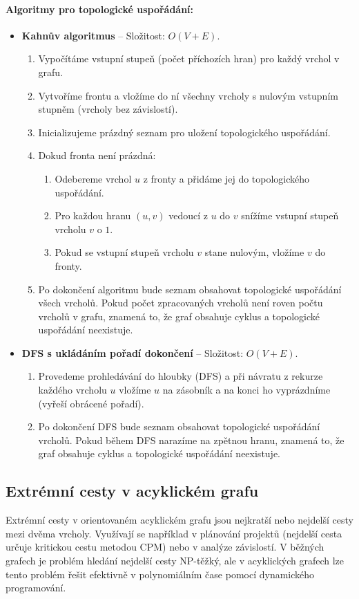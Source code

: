 \paragraph*{Algoritmy pro topologické uspořádání:}
\begin{itemize}
\item \textbf{Kahnův algoritmus} -- Složitost: $O(V + E)$.
\begin{enumerate}
    \item Vypočítáme vstupní stupeň (počet příchozích hran) pro každý vrchol v grafu.
    \item Vytvoříme frontu a vložíme do ní všechny vrcholy s nulovým vstupním stupněm (vrcholy bez závislostí).
    \item Inicializujeme prázdný seznam pro uložení topologického uspořádání.
    \item Dokud fronta není prázdná:
    \begin{enumerate}
        \item[(a)] Odebereme vrchol $u$ z fronty a přidáme jej do topologického uspořádání.
        \item[(b)] Pro každou hranu $(u, v)$ vedoucí z $u$ do $v$ snížíme vstupní stupeň vrcholu $v$ o $1$.
        \item[(c)] Pokud se vstupní stupeň vrcholu $v$ stane nulovým, vložíme $v$ do fronty.
    \end{enumerate}
    \item Po dokončení algoritmu bude seznam obsahovat topologické uspořádání všech vrcholů. Pokud počet zpracovaných vrcholů není roven počtu vrcholů v grafu, znamená to, že graf obsahuje cyklus a topologické uspořádání neexistuje.
\end{enumerate}
\item \textbf{DFS s ukládáním pořadí dokončení} -- Složitost: $O(V + E)$.
\begin{enumerate}
    \item Provedeme prohledávání do hloubky (DFS) a při návratu z rekurze každého vrcholu $u$ vložíme $u$ na  zásobník a na konci ho vyprázdníme (vyřeší obrácené pořadí).
    \item Po dokončení DFS bude seznam obsahovat topologické uspořádání vrcholů. Pokud během DFS narazíme na zpětnou hranu, znamená to, že graf obsahuje cyklus a topologické uspořádání neexistuje.
\end{enumerate}
\end{itemize}

\subsection{Extrémní cesty v acyklickém grafu}
Extrémní cesty v orientovaném acyklickém grafu jsou nejkratší nebo nejdelší cesty 
mezi dvěma vrcholy. Využívají se například v plánování projektů (nejdelší cesta určuje 
kritickou cestu metodou CPM) nebo v analýze závislostí. V běžných grafech je problém hledání 
nejdelší cesty NP-těžký, ale v acyklických grafech lze tento problém řešit efektivně 
v polynomiálním čase pomocí dynamického programování.

